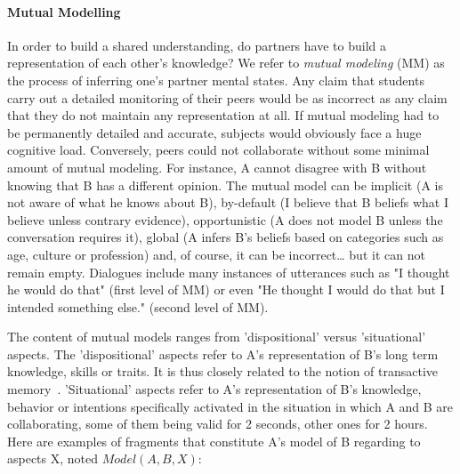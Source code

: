 \documentclass{report}
\begin{document}
\paragraph{Mutual Modelling}

In order to build a shared understanding, do partners have to build a
representation of each other's knowledge? We refer to \emph{mutual modeling} (MM) as
the process of inferring one's partner mental states. Any claim that students
carry out a detailed monitoring of their peers would be as incorrect as any
claim that they do not maintain any representation at all. If mutual modeling
had to be permanently detailed and accurate, subjects would obviously face a
huge cognitive load. Conversely, peers could not collaborate without some
minimal amount of mutual modeling. For instance, A cannot disagree with B
without knowing that B has a different opinion. The mutual model can be implicit
(A is not aware of what he knows about B), by-default (I believe that B beliefs
what I believe unless contrary evidence), opportunistic (A does not model B
unless the conversation requires it), global (A infers B's beliefs based on
categories such as age, culture or profession) and, of course, it can be
incorrect… but it can not remain empty. Dialogues include many instances of
utterances such as "I thought he would do that" (first level of MM) or even "He
thought I would do that but I intended something else." (second level of MM). 

The content of mutual models ranges from 'dispositional' versus 'situational'
aspects. The 'dispositional' aspects refer to A's representation of B's long
term knowledge, skills or traits. It is thus closely related to the notion of
transactive memory~\cite{wegner1987transactive, moreland1999transactive}.
'Situational' aspects refer to A's representation of B's knowledge, behavior or
intentions specifically activated in the situation in which A and B are
collaborating, some of them being valid for 2 seconds, other ones for 2 hours.
Here are examples of fragments that constitute A's model of B regarding to
aspects X, noted $Model(A,B,X)$:
\end{document}
